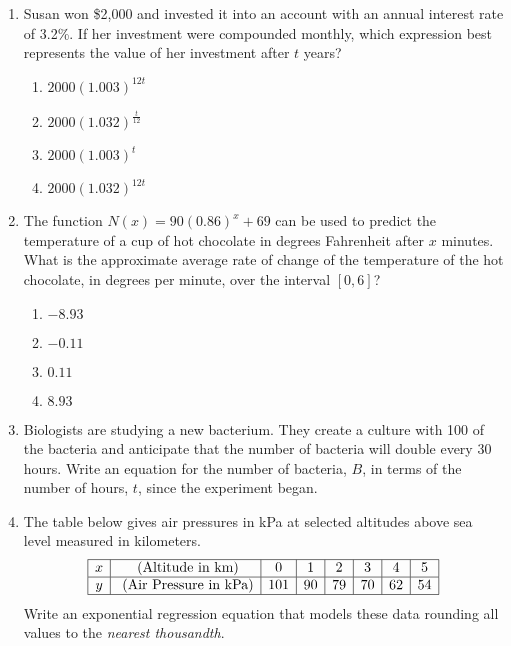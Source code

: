 \documentclass[12pt, twoside]{article}
\begin{document}
\begin{enumerate}[itemsep=0.5cm]
\item Susan won \$2,000 and invested it into an account with an annual interest rate of 3.2\%. If her investment were compounded monthly, which expression best represents the value of her investment after $t$ years?
\begin{enumerate}
    \item $2000(1.003)^{12t}$
    \item $2000(1.032)^{\frac{t}{12}}$
    \item $2000(1.003)^{t}$
    \item $2000(1.032)^{12t}$
\end{enumerate}

\item The function $N(x) = 90(0.86)^x + 69$ can be used to predict the temperature of a cup of hot chocolate in degrees Fahrenheit after $x$ minutes. What is the approximate average rate of change of the temperature of the hot chocolate, in degrees per minute, over the interval $[0, 6]$?
\begin{enumerate}
    \item $-8.93$
    \item $-0.11$
    \item $0.11$
    \item $8.93$
\end{enumerate}

\item Biologists are studying a new bacterium. They create a culture with 100 of the bacteria and anticipate that the number of bacteria will double every 30 hours. Write an equation for the number of bacteria, $B$, in terms of the number of hours, $t$, since the experiment began.

\item The table below gives air pressures in kPa at selected altitudes above sea level measured in kilometers.
    \[
    \begin{array}{|c|c|c|c|c|c|c|c|}
    \hline
    x & \text{ (Altitude in km)} & 0 & 1 & 2 & 3 & 4 & 5 \\
    \hline
    y & \text{ (Air Pressure in kPa)} & 101 & 90 & 79 & 70 & 62 & 54 \\
    \hline
    \end{array}
    \]
Write an exponential regression equation that models these data rounding all values to the \emph{nearest thousandth}. \vspace{1cm}


\end{enumerate}
\end{document}
